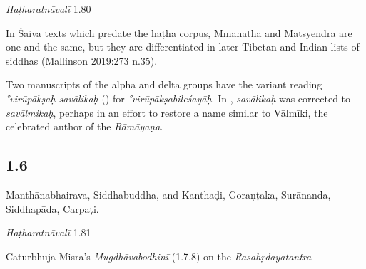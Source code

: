 \begin{ekdosis}
\begin{testimonia}[hp01_005]
\emph{Haṭharatnāvalī} 1.80

\begin{versinnote}
\end{versinnote}

\end{testimonia}

\begin{philcomm}[hp01_005]     
In Śaiva texts which predate the haṭha corpus, Mīnanātha and Matsyendra are one and the same, but they are differentiated in later Tibetan and Indian lists of siddhas (Mallinson 2019:273 n.35).   

Two manuscripts of the alpha and delta groups have the variant reading \emph{°virūpākṣaḥ savālikaḥ} () for \emph{°virūpākṣabileśayāḥ}. In , \emph{savālikaḥ} was corrected to \emph{savālmikaḥ}, perhaps in an effort to restore a name similar to Vālmīki, the celebrated author of the \textit{Rāmāyaṇa}.
\end{philcomm}

\subsection*{1.6}
\begin{translation}[hp01_006]
Manthānabhairava, Siddhabuddha, and Kanthaḍi, Goraṇṭaka, Surānanda, Siddhapāda, Carpaṭi.
\end{translation}

\begin{testimonia}[hp01_006]
\emph{Haṭharatnāvalī} 1.81

\begin{versinnote}
\tl{\var{korandakaḥ ] gonandaka P,T,J,n1,n4}\\!}
\end{versinnote}

Caturbhuja Misra's \emph{Mugdhāvabodhinī} (1.7.8) on the \emph{Rasahṛdayatantra}

\begin{versinnote}
\end{versinnote}


\end{testimonia}
\end{ekdosis}
